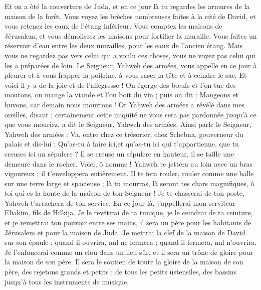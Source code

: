 \begin{multicols}{2}
Et on a ôté la couverture de Juda, et en ce jour là tu regardes les armures de la maison de la forêt.
Vous voyez les brèches nombreuses faites à la cité de David, et vous retenez les eaux de l'étang inférieur.
Vous comptez les maisons de Jérusalem, et vous démolissez les maisons pour fortifier la muraille.
Vous faites un réservoir d'eau entre les deux murailles, pour les eaux de l'ancien étang. Mais vous ne regardez pas vers celui qui a voulu ces choses, vous ne voyez pas celui qui les a préparées de loin.
Le Seigneur, Yahweh des armées, vous appelle en ce jour à pleurer et à vous frapper la poitrine, à vous raser la tête et à ceindre le sac.
Et voici il y a de la joie et de l'allégresse ! On égorge des bœufs et l'on tue des moutons, on mange la viande et l'on boit du vin ; puis on dit : Mangeons et buvons, car demain nous mourrons !
Or Yahweh des armées a révélé dans mes oreilles, disant : certainement cette iniquité ne vous sera pas pardonnée jusqu'à ce que vous mouriez, a dit le Seigneur, Yahweh des armées.
Ainsi parle le Seigneur, Yahweh des armées : Va, entre chez ce trésorier, chez Schebna, gouverneur du palais et dis-lui :
Qu'as-tu à faire ici,et qu'as-tu ici qui t'appartienne, que tu creuses ici un sépulcre ? Il se creuse un sépulcre en hauteur, il se taille une demeure dans le rocher.
Voici, ô homme ! Yahweh te jettera au loin avec un bras vigoureux ; il t'enveloppera entièrement.
Il te fera rouler, rouler comme une balle sur une terre large et spacieuse ; là tu mourras, là seront tes chars magnifiques, ô toi qui es la honte de la maison de ton Seigneur !
Je te chasserai de ton poste, Yahweh t'arrachera de ton service.
En ce jour-là, j'appellerai mon serviteur Eliakim, fils de Hilkija.
Je le revêtirai de ta tunique, je le ceindrai de ta ceinture, et je remettrai ton pouvoir entre ses mains, il sera un père pour les habitants de Jérusalem et pour la maison de Juda.
Je mettrai la clef de la maison de David sur son épaule ; quand il ouvrira, nul ne fermera ; quand il fermera, nul n'ouvrira.
Je l'enfoncerai comme un clou dans un lieu sûr, et il sera un trône de gloire pour la maison de son père.
Il sera le soutien de toute la gloire de la maison de son père, des rejetons grands et petits ; de tous les petits ustensiles, des bassins jusqu'à tous les instruments de musique.

\end{multicols}
